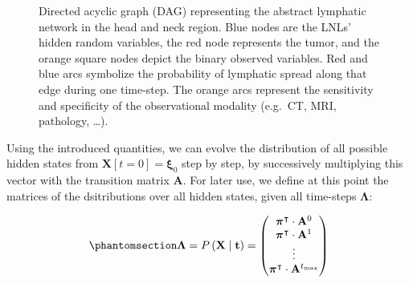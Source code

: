 \documentclass[
  sn-mathphys-num,
]{sn-jnl}
\begin{document}
\begin{figure}


\caption{\label{fig-full-graph}Directed acyclic graph (DAG) representing
the abstract lymphatic network in the head and neck region. Blue nodes
are the LNLs' hidden random variables, the red node represents the
tumor, and the orange square nodes depict the binary observed variables.
Red and blue arcs symbolize the probability of lymphatic spread along
that edge during one time-step. The orange arcs represent the
sensitivity and specificity of the observational modality (e.g.~CT, MRI,
pathology, \ldots).}

\end{figure}%

Using the introduced quantities, we can evolve the distribution of all
possible hidden states from \(\mathbf{X}[t=0] = \boldsymbol{\xi}_0\)
step by step, by successively multiplying this vector with the
transition matrix \(\mathbf{A}\). For later use, we define at this point
the matrices of the dsitributions over all hidden states, given all
time-steps \(\boldsymbol{\Lambda}\):

\begin{equation}\phantomsection\label{eq-lambda-matrix}{
\boldsymbol{\Lambda} = P \left( \mathbf{X} \mid \mathbf{t} \right) = \begin{pmatrix}
\boldsymbol{\pi}^\intercal \cdot \mathbf{A}^0 \\
\boldsymbol{\pi}^\intercal \cdot \mathbf{A}^1 \\
\vdots \\
\boldsymbol{\pi}^\intercal \cdot \mathbf{A}^{t_\text{max}} \\
\end{pmatrix}
}\end{equation}
\end{document}
